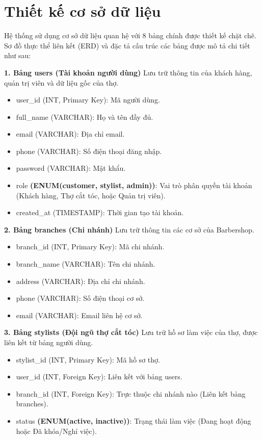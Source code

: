 \documentclass[../BTL.tex]{subfiles}
\begin{document}
\section{Thiết kế cơ sở dữ liệu}
Hệ thống sử dụng cơ sở dữ liệu quan hệ với 8 bảng chính được thiết kế
chặt chẽ. Sơ đồ thực thể liên kết (ERD) và đặc tả cấu trúc các bảng được
mô tả chi tiết như sau:

\textbf{1. Bảng users (Tài khoản người dùng)} Lưu trữ thông tin của
khách hàng, quản trị viên và dữ liệu gốc của thợ.

\begin{itemize}
\item
  user\_id (INT, Primary Key): Mã người dùng.
\item
  full\_name (VARCHAR): Họ và tên đầy đủ.
\item
  email (VARCHAR): Địa chỉ email.
\item
  phone (VARCHAR): Số điện thoại đăng nhập.
\item
  password (VARCHAR): Mật khẩu.
\item
  role \textbf{(ENUM(\textquotesingle customer\textquotesingle,
  \textquotesingle stylist\textquotesingle,
  \textquotesingle admin\textquotesingle))}: Vai trò phân quyền tài
  khoản (Khách hàng, Thợ cắt tóc, hoặc Quản trị viên).
\item
  created\_at (TIMESTAMP): Thời gian tạo tài khoản.
\end{itemize}

\textbf{2. Bảng branches (Chi nhánh)} Lưu trữ thông tin các cơ sở của
Barbershop.

\begin{itemize}
\item
  branch\_id (INT, Primary Key): Mã chi nhánh.
\item
  branch\_name (VARCHAR): Tên chi nhánh.
\item
  address (VARCHAR): Địa chỉ chi nhánh.
\item
  phone (VARCHAR): Số điện thoại cơ sở.
\item
  email (VARCHAR): Email liên hệ cơ sở.
\end{itemize}

\textbf{3. Bảng stylists (Đội ngũ thợ cắt tóc)} Lưu trữ hồ sơ làm việc
của thợ, được liên kết từ bảng người dùng.

\begin{itemize}
\item
  stylist\_id (INT, Primary Key): Mã hồ sơ thợ.
\item
  user\_id (INT, Foreign Key): Liên kết với bảng users.
\item
  branch\_id (INT, Foreign Key): Trực thuộc chi nhánh nào (Liên kết bảng
  branches).
\item
  status \textbf{(ENUM(\textquotesingle active\textquotesingle,
  \textquotesingle inactive\textquotesingle))}: Trạng thái làm việc
  (Đang hoạt động hoặc Đã khóa/Nghỉ việc).
\end{itemize}
\end{document}
